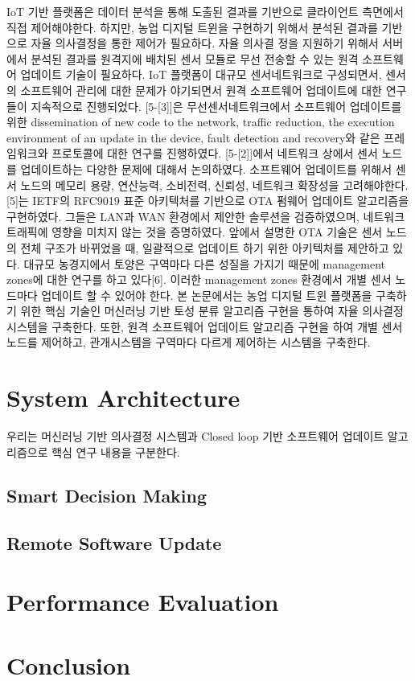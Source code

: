 \documentclass[11pt]{article}
\begin{document}
IoT 기반 플랫폼은 데이터 분석을 통해 도출된 결과를 기반으로 클라이언트 측면에서 직접 제어해야한다. 하지만, 농업 디지털 트윈을 구현하기 위해서 분석된 결과를 기반으로 자율 의사결정을 통한 제어가 필요하다. 자율 의사결 정을 지원하기 위해서 서버에서 분석된 결과를 원격지에 배치된 센서 모듈로 무선 전송할 수 있는 원격 소프트웨어 업데이트 기술이 필요하다. IoT 플랫폼이 대규모 센서네트워크로 구성되면서, 센서의 소프트웨어 관리에 대한 문제가 야기되면서 원격 소프트웨어 업데이트에 대한 연구들이 지속적으로 진행되었다.
[5-[3]]은 무선센서네트워크에서 소프트웨어 업데이트를 위한 dissemination of new code to the network, traffic reduction, the execution environment of an update in the device, fault detection and recovery와 같은 프레임워크와 프로토콜에 대한 연구를 진행하였다. [5-[2]]에서 네트워크 상에서 센서 노드를 업데이트하는 다양한 문제에 대해서 논의하였다. 소프트웨어 업데이트를 위해서 센서 노드의 메모리 용량, 연산능력, 소비전력, 신뢰성, 네트워크 확장성을 고려해야한다. [5]는 IETF의 RFC9019 표준 아키텍처를 기반으로 OTA 펌웨어 업데이트 알고리즘을 구현하였다. 그들은 LAN과 WAN 환경에서 제안한 솔루션을 검증하였으며, 네트워크 트래픽에 영향을 미치지 않는 것을 증명하였다. 앞에서 설명한 OTA 기술은 센서 노드의 전체 구조가 바뀌었을 때, 일괄적으로 업데이트 하기 위한 아키텍처를 제안하고 있다. 대규모 농경지에서 토양은 구역마다 다른 성질을 가지기 때문에 management zones에 대한 연구를 하고 있다[6]. 이러한 management zones 환경에서 개별 센서 노드마다 업데이트 할 수 있어야 한다. 본 논문에서는 농업 디지털 트윈 플랫폼을 구축하기 위한 핵심 기술인 머신러닝 기반 토성 분류 알고리즘 구현을 통하여 자율 의사결정 시스템을 구축한다. 또한, 원격 소프트웨어 업데이트 알고리즘 구현을 하여 개별 센서 노드를 제어하고, 관개시스템을 구역마다 다르게 제어하는 시스템을 구축한다.

\section{System Architecture}
우리는 머신러닝 기반 의사결정 시스템과 Closed loop 기반 소프트웨어 업데이트 알고리즘으로 핵심 연구 내용을 구분한다.

\subsection{Smart Decision Making}

\subsection{Remote Software Update}

\section{Performance Evaluation}

\section{Conclusion}
\end{document}
